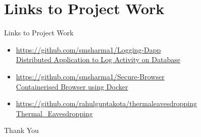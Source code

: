 \documentclass{beamer}
\begin{document}
\section{Links to Project Work}
\begin{frame}{Links to Project Work}
\begin{itemize}
    \item \href{https://github.com/smsharma1/Logging-Dapp}{https://github.com/smsharma1/Logging-Dapp \\ Distributed Application to Log Activity on Database} 
    \item \href{https://github.com/smsharma1/Secure-Browser}{https://github.com/smsharma1/Secure-Browser \\Containerised Browser using Docker}
    \item \href{https://github.com/rahulguptakota/thermal\textunderscore eavesdropping}{https://github.com/rahulguptakota/thermal\textunderscore eavesdropping \\Thermal\_Eavesdropping}
\end{itemize}    
\end{frame}
\begin{frame}
\begin{center}
\Huge Thank You
\end{center}
\end{frame}
\end{document}
